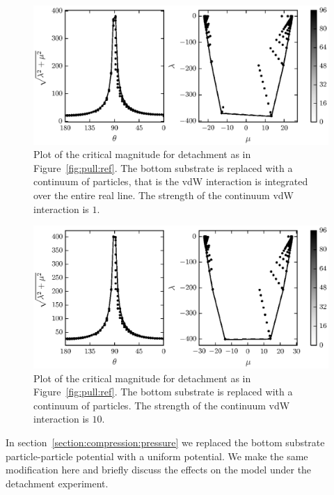    \begin{figure}[t!]
      \begin{center}
         \includegraphics{./fig/ch3/pull/p1/grid.eps}
      \end{center}      
      \caption{Plot of the critical magnitude for detachment as in Figure~\ref{fig:pull:ref}. The bottom substrate is replaced with a continuum of particles, that is the vdW interaction is integrated over the entire real line. The strength of the continuum vdW interaction is $1$.
      \label{fig:pull:p1}}
   \end{figure}
   
   \begin{figure}[th!]
      \begin{center}
         \includegraphics{./fig/ch3/pull/p10/grid.eps}
      \end{center}      
      \caption{Plot of the critical magnitude for detachment as in Figure~\ref{fig:pull:ref}. The bottom substrate is replaced with a continuum of particles. The strength of the continuum vdW interaction is $10$.
      \label{fig:pull:p10}}
   \end{figure}

In section~\ref{section:compression:pressure} we replaced the bottom substrate particle-particle potential with a uniform potential. We make the same modification here and briefly discuss the effects on the model under the detachment experiment.


